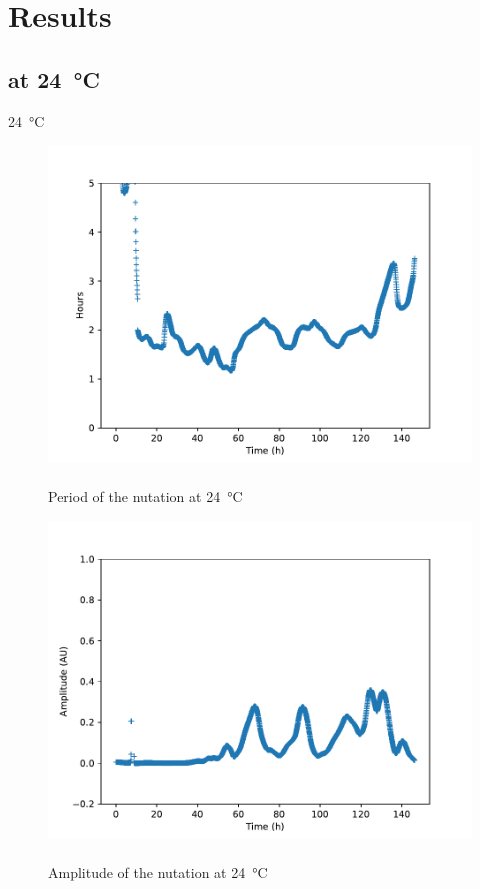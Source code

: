 \documentclass[12pt]{beamer}
\begin{document}
\section{Results}
\subsection{at \SI{24}{\celsius}}
\begin{frame}{\SI{24}{\celsius}}
\begin{multicols}{2}
\begin{figure}
\includegraphics[width = \linewidth]{period.pdf}~\\
Period of the nutation at \SI{24}{\celsius}
\end{figure}
\begin{figure}
\includegraphics[width = \linewidth]{ampl.pdf}~\\
Amplitude of the nutation at \SI{24}{\celsius}
\end{figure}
\end{multicols}
\end{frame}
\end{document}
